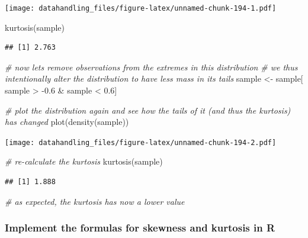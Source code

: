 \documentclass[
  12pt,
]{style/krantz}
\newenvironment{Shaded}{\begin{snugshade}}{\end{snugshade}}
\newcommand{\CommentTok}[1]{\textcolor[rgb]{0.56,0.35,0.01}{\textit{#1}}}
\newcommand{\FloatTok}[1]{\textcolor[rgb]{0.00,0.00,0.81}{#1}}
\newcommand{\FunctionTok}[1]{\textcolor[rgb]{0.00,0.00,0.00}{#1}}
\newcommand{\NormalTok}[1]{#1}
\newcommand{\OtherTok}[1]{\textcolor[rgb]{0.56,0.35,0.01}{#1}}
\newcommand{\SpecialCharTok}[1]{\textcolor[rgb]{0.00,0.00,0.00}{#1}}
\begin{document}
\texttt{[image: datahandling\_files/figure-latex/unnamed-chunk-194-1.pdf]}

\begin{Shaded}
\begin{Highlighting}[]
\FunctionTok{kurtosis}\NormalTok{(sample)}
\end{Highlighting}
\end{Shaded}

\begin{verbatim}
## [1] 2.763
\end{verbatim}

\begin{Shaded}
\begin{Highlighting}[]
\CommentTok{\# now lets remove observations from the extremes in this distribution}
\CommentTok{\# we thus intentionally alter the distribution to have less mass in its tails}
\NormalTok{sample }\OtherTok{\textless{}{-}}\NormalTok{ sample[ sample }\SpecialCharTok{\textgreater{}} \SpecialCharTok{{-}}\FloatTok{0.6} \SpecialCharTok{\&}\NormalTok{ sample }\SpecialCharTok{\textless{}} \FloatTok{0.6}\NormalTok{]}

\CommentTok{\# plot the distribution again and see how the tails of it (and thus the kurtosis) has changed}
\FunctionTok{plot}\NormalTok{(}\FunctionTok{density}\NormalTok{(sample))}
\end{Highlighting}
\end{Shaded}

\texttt{[image: datahandling\_files/figure-latex/unnamed-chunk-194-2.pdf]}

\begin{Shaded}
\begin{Highlighting}[]
\CommentTok{\# re{-}calculate the kurtosis}
\FunctionTok{kurtosis}\NormalTok{(sample)}
\end{Highlighting}
\end{Shaded}

\begin{verbatim}
## [1] 1.888
\end{verbatim}

\begin{Shaded}
\begin{Highlighting}[]
\CommentTok{\# as expected, the kurtosis has now a lower value}
\end{Highlighting}
\end{Shaded}

\hypertarget{implement-the-formulas-for-skewness-and-kurtosis-in-r}{%
\subsubsection{Implement the formulas for skewness and kurtosis in R}\label{implement-the-formulas-for-skewness-and-kurtosis-in-r}}
\end{document}

